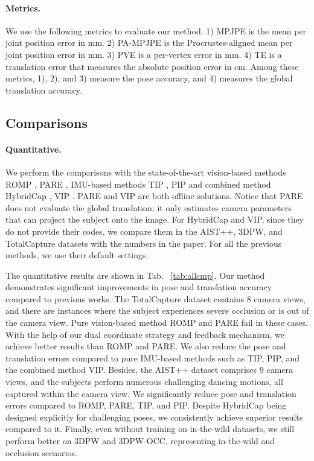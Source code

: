 \documentclass[sigconf,nonacm=true]{acmart}
\begin{document}
\paragraph{Metrics.}
We use the following metrics to evaluate our method.
1) MPJPE is the mean per joint position error in mm.
2) PA-MPJPE is the Procrustes-aligned mean per joint position error in mm.
3) PVE is a per-vertex error in mm.
4) TE is a translation error that measures the absolute position error in cm.
Among these metrics, 1), 2), and 3) measure the pose accuracy, and 4) measures the global translation accuracy.
\subsection{Comparisons}\label{sec:comparisons}
\paragraph{Quantitative.}
We perform the comparisons with the state-of-the-art vision-based methods ROMP \cite{ROMP}, PARE \cite{PARE}, IMU-based methods TIP \cite{TIP}, PIP \cite{PIP} and combined method HybridCap \cite{HybridCap}, VIP \cite{VIP}.
PARE and VIP are both offline solutions.
Notice that PARE does not evaluate the global translation; it only estimates camera parameters that can project the subject onto the image.
For HybridCap and VIP, since they do not provide their codes, we compare them in the AIST++, 3DPW, and TotalCapture datasets with the numbers in the paper.
For all the previous methods, we use their default settings.
\par
The quantitative results are shown in Tab. ~\ref{tab:allcmp}.
Our method demonstrates significant improvements in pose and translation accuracy compared to previous works.
The TotalCapture dataset contains 8 camera views, and there are instances where the subject experiences severe occlusion or is out of the camera view.
Pure vision-based method ROMP and PARE fail in these cases.
With the help of our dual coordinate strategy and feedback mechanism, we achieve better results than ROMP and PARE.
We also reduce the pose and translation errors compared to pure IMU-based methods such as TIP, PIP, and the combined method VIP.
Besides, the AIST++ dataset comprises 9 camera views, and the subjects perform numerous challenging dancing motions, all captured within the camera view.
We significantly reduce pose and translation errors compared to ROMP, PARE, TIP, and PIP.
Despite HybridCap being designed explicitly for challenging poses, we consistently achieve superior results compared to it.
Finally, even without training on in-the-wild datasets, we still perform better on 3DPW and 3DPW-OCC, representing in-the-wild and occlusion scenarios.
\end{document}
